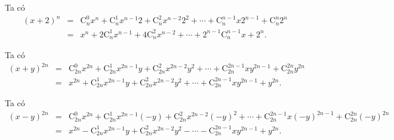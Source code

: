 \begin{bt}
{\begin{listEX}
		\item Ta có 
		\begin{eqnarray*}
			(x+2)^n&=&\mathrm{C}_n^0 x^n+ \mathrm{C}_n^1 x^{n-1} 2+\mathrm{C}_n^2 x^{n-2} 2^2+\cdots +\mathrm{C}_n^{n-1} x 2^{n-1}+\mathrm{C}_n^n 2^n\\
			&=&x^n+2\mathrm{C}_n^1 x^{n-1}+4\mathrm{C}_n^2 x^{n-2} +\cdots +2^{n-1}\mathrm{C}_n^{n-1} x + 2^n.
		\end{eqnarray*}
		\item Ta có
		\begin{eqnarray*}
			(x+y)^{2n}&=& \mathrm{C}_{2n}^0 x^{2n} +\mathrm{C}_{2n}^1 x^{2n-1} y+\mathrm{C}_{2n}^2 x^{2n-2} y^2+\cdots+\mathrm{C}_{2n}^{2n-1} x y^{2n-1}+\mathrm{C}_{2n}^{2n} y^{2n}\\
			&=&  x^{2n} +\mathrm{C}_{2n}^1 x^{2n-1} y+\mathrm{C}_{2n}^2 x^{2n-2} y^2+\cdots+\mathrm{C}_{2n}^{2n-1} x y^{2n-1}+ y^{2n}.
		\end{eqnarray*}
		\item Ta có
		\begin{eqnarray*}
			(x-y)^{2n}&=& \mathrm{C}_{2n}^0 x^{2n} +\mathrm{C}_{2n}^1 x^{2n-1} (-y)+\mathrm{C}_{2n}^2 x^{2n-2} (-y)^2+\cdots+\mathrm{C}_{2n}^{2n-1} x (-y)^{2n-1}+\mathrm{C}_{2n}^{2n} (-y)^{2n}\\
			&=&  x^{2n} -\mathrm{C}_{2n}^1 x^{2n-1} y+\mathrm{C}_{2n}^2 x^{2n-2} y^2-\cdots-\mathrm{C}_{2n}^{2n-1} x y^{2n-1}+ y^{2n}.
		\end{eqnarray*}
	\end{listEX}
}
\end{bt}
